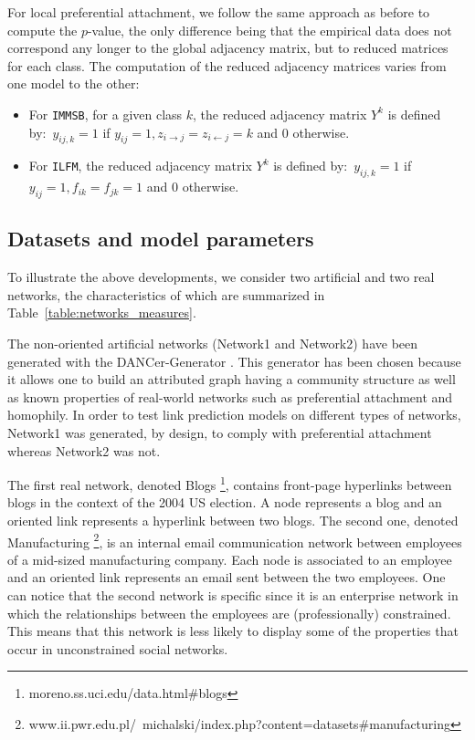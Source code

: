 \documentclass[french]{hermes-journal}
\newcommand{\ilfm}{\texttt{ILFM}}
\newcommand{\immsb}{\texttt{IMMSB}}
\begin{document}
For local preferential attachment, we follow the same approach as before to compute the $p$-value, the only difference being that the empirical data does not correspond any longer to the global adjacency matrix, but to reduced matrices for each class. The computation of the reduced adjacency matrices varies from one model to the other:
%
\begin{itemize}
    \item For \immsb, for a given class $k$, the reduced adjacency matrix $Y^k$ is defined by:~$y_{ij,k}=1$ if $y_{ij}=1, z_{i\rightarrow j}=z_{i\leftarrow j}=k$ and $0$ otherwise.
        \item For \ilfm, the reduced adjacency matrix $Y^k$ is defined by:~$ y_{ij,k}=1$ if $y_{ij}=1 , f_{ik}=f_{jk}=1$ and $0$ otherwise.
\end{itemize}
%

\subsection{Datasets and model parameters}

To illustrate the above developments, we consider two artificial and two real networks, the characteristics of which are summarized in Table~\ref{table:networks_measures}.



The non-oriented artificial networks (Network1 and Network2) have been generated with the DANCer-Generator \cite{largeron2015}. This generator has been chosen because it allows one to build an attributed graph having a community structure as well as known properties of real-world networks such as preferential attachment and homophily. In order to test link prediction models on different types of networks, Network1 was generated, by design, to comply with preferential attachment whereas Network2 was not.

The first real network, denoted Blogs \footnote{moreno.ss.uci.edu/data.html\#blogs}, contains front-page hyperlinks between blogs in the context of the 2004 US election. A node represents a blog and an oriented link represents a hyperlink between two blogs. The second one, denoted Manufacturing \footnote{www.ii.pwr.edu.pl/~michalski/index.php?content=datasets\#manufacturing}, is an internal email communication network between employees of a mid-sized manufacturing company. Each node is associated to an employee and an oriented link represents an email sent between the two employees. One can notice that the second network is specific since it is an enterprise network in which the relationships between the employees are (professionally) constrained. This means that this network is less likely to display some of the properties that occur in unconstrained social networks.
\end{document}
